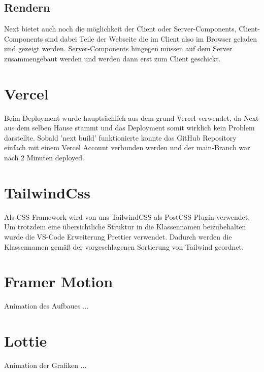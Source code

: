 \subsection{Rendern}
Next bietet auch noch die möglichkeit der Client oder Server-Components, Client-Components sind dabei Teile der Webseite die im Client also im Browser geladen und gezeigt werden.
Server-Components hingegen müssen auf dem Server zusammengebaut werden und werden dann erst zum Client geschickt.

\section{Vercel}
Beim Deployment wurde hauptsächlich aus dem grund Vercel verwendet, da Next aus dem selben Hause stammt und das Deployment somit wirklich kein Problem darstellte.
Sobald 'next build' funktionierte konnte das GitHub Repository einfach mit einem Vercel Account verbunden werden und der main-Branch war nach 2 Minuten deployed. 

\section{TailwindCss}
Als CSS Framework wird von uns TailwindCSS als PostCSS Plugin verwendet. 
Um trotzdem eine übersichtliche Struktur in die Klassennamen beizubehalten wurde die VS-Code Erweiterung Prettier verwendet. Dadurch werden die Klassennamen gemäß der vorgeschlagenen Sortierung von Tailwind geordnet.



\section{Framer Motion}
Animation des Aufbaues ...

\section{Lottie}
Animation der Grafiken ...


